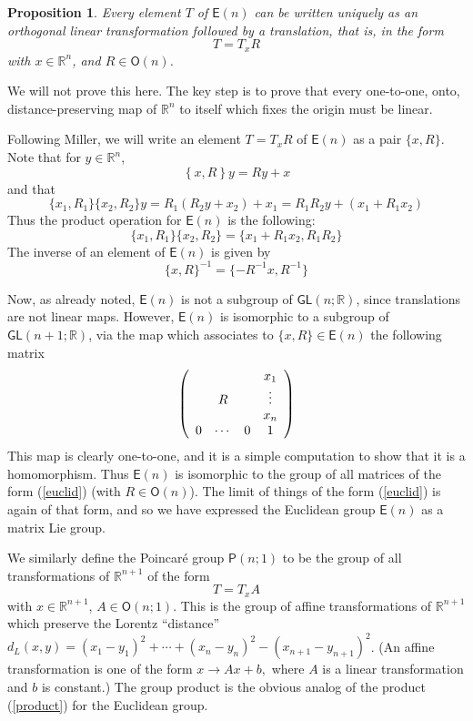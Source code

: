 \documentclass{amsbook}
\theoremstyle{plain}
\newtheorem{proposition}[theorem]{Proposition}
\numberwithin{equation}{chapter}
\numberwithin{theorem}{chapter}
\begin{document}
\begin{proposition}
Every element $T$ of $\mathsf{E}(n)$ can be written uniquely as an orthogonal
linear transformation followed by a translation, that is, in the form
\[
T=T_{x}R
\]
with $x\in\mathbb{R}^{n}$, and $R\in\mathsf{O}(n)$.
\end{proposition}

We will not prove this here. The key step is to prove that every one-to-one,
onto, distance-preserving map of $\mathbb{R}^{n}$ to itself which fixes the
origin must be linear.

Following Miller, we will write an element $T=T_{x}R$ of $\mathsf{E}(n)$ as a
pair $\{x,R\}$. Note that for $y\in\mathbb{R}^{n}$,
\[
\left\{  x,R\right\}  y=Ry+x
\]
and that
\[
\{x_{1},R_{1}\}\{x_{2},R_{2}\}y=R_{1}(R_{2}y+x_{2})+x_{1}=R_{1}R_{2}%
y+(x_{1}+R_{1}x_{2})
\]
Thus the product operation for $\mathsf{E}(n)$ is the following:
\begin{equation}
\{x_{1},R_{1}\}\{x_{2},R_{2}\}=\{x_{1}+R_{1}x_{2},R_{1}R_{2}\}\label{product}%
\end{equation}
The inverse of an element of $\mathsf{E}(n)$ is given by
\[
\{x,R\}^{-1}=\{-R^{-1}x,R^{-1}\}
\]

Now, as already noted, $\mathsf{E}(n)$ is not a subgroup of $\mathsf{GL}%
(n;\mathbb{R})$, since translations are not linear maps. However,
$\mathsf{E}(n) $ is isomorphic to a subgroup of $\mathsf{GL}(n+1;\mathbb{R})$,
via the map which associates to $\{x,R\}\in\mathsf{E}(n)$ the following
matrix
\begin{equation}
\left(
\begin{array}
[c]{cccc}%
&  &  & x_{1}\\
& R &  & \vdots\\
&  &  &  x_{n}\\
0 & \cdots & 0 & 1
\end{array}
\right) \label{euclid}%
\end{equation}
This map is clearly one-to-one, and it is a simple computation to show that it
is a homomorphism. Thus $\mathsf{E}(n)$ is isomorphic to the group of all
matrices of the form (\ref{euclid}) (with $R\in\mathsf{O}(n)$). The limit of
things of the form (\ref{euclid}) is again of that form, and so we have
expressed the Euclidean group $\mathsf{E}(n)$ as a matrix Lie group.

We similarly define the Poincar\'{e} group $\mathsf{P}(n;1)$ to be the group
of all transformations of $\mathbb{R}^{n+1}$ of the form
\[
T=T_{x}A
\]
with $x\in\mathbb{R}^{n+1}$, $A\in\mathsf{O}(n;1)$. This is the group of
affine transformations of $\mathbb{R}^{n+1}$ which preserve the Lorentz
``distance'' $d_{L}(x,y)=(x_{1}-y_{1})^{2}+\cdots+(x_{n}-y_{n})^{2}%
-(x_{n+1}-y_{n+1})^{2}$. (An affine transformation is one of the form
$x\rightarrow Ax+b,$ where $A$ is a linear transformation and $b$ is
constant.) The group product is the obvious analog of the product
(\ref{product}) for the Euclidean group.
\end{document}
